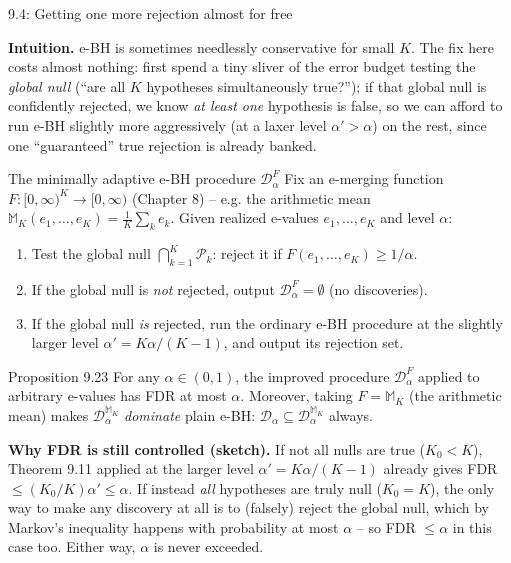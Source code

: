 \documentclass[aspectratio=169,10pt]{beamer}
\begin{document}
\begin{frame}[allowframebreaks]{9.4: Getting one more rejection almost for free}

\textbf{Intuition.} e-BH is sometimes needlessly conservative for small $K$. The fix here costs almost nothing: first spend a tiny sliver of the error budget testing the \emph{global null} (``are all $K$ hypotheses simultaneously true?''); if that global null is confidently rejected, we know \emph{at least one} hypothesis is false, so we can afford to run e-BH slightly more aggressively (at a laxer level $\alpha'>\alpha$) on the rest, since one ``guaranteed'' true rejection is already banked.

\begin{block}{The minimally adaptive e-BH procedure $\mathcal{D}_\alpha^F$}
Fix an e-merging function $F:[0,\infty)^K\to[0,\infty)$ (Chapter 8) -- e.g. the arithmetic mean $\mathbb{M}_K(e_1,\dots,e_K)=\frac1K\sum_k e_k$. Given realized e-values $e_1,\dots,e_K$ and level $\alpha$:
\begin{enumerate}
\item[\textbf{Step 1.}] Test the global null $\bigcap_{k=1}^K \mathcal{P}_k$: reject it if $F(e_1,\dots,e_K)\ge 1/\alpha$.
\item[\textbf{Step 2.}] If the global null is \emph{not} rejected, output $\mathcal{D}_\alpha^F=\emptyset$ (no discoveries).
\item[\textbf{Step 3.}] If the global null \emph{is} rejected, run the ordinary e-BH procedure at the slightly larger level $\alpha' = K\alpha/(K-1)$, and output its rejection set.
\end{enumerate}
\end{block}

\framebreak

\begin{block}{Proposition 9.23}
For any $\alpha\in(0,1)$, the improved procedure $\mathcal{D}_\alpha^F$ applied to arbitrary e-values has FDR at most $\alpha$. Moreover, taking $F=\mathbb{M}_K$ (the arithmetic mean) makes $\mathcal{D}_\alpha^{\mathbb{M}_K}$ \emph{dominate} plain e-BH: $\mathcal{D}_\alpha \subseteq \mathcal{D}_\alpha^{\mathbb{M}_K}$ always.
\end{block}

\textbf{Why FDR is still controlled (sketch).} If not all nulls are true ($K_0<K$), Theorem 9.11 applied at the larger level $\alpha'=K\alpha/(K-1)$ already gives FDR $\le (K_0/K)\alpha' \le \alpha$. If instead \emph{all} hypotheses are truly null ($K_0=K$), the only way to make any discovery at all is to (falsely) reject the global null, which by Markov's inequality happens with probability at most $\alpha$ -- so FDR $\le \alpha$ in this case too. Either way, $\alpha$ is never exceeded.


\end{frame}
\end{document}
